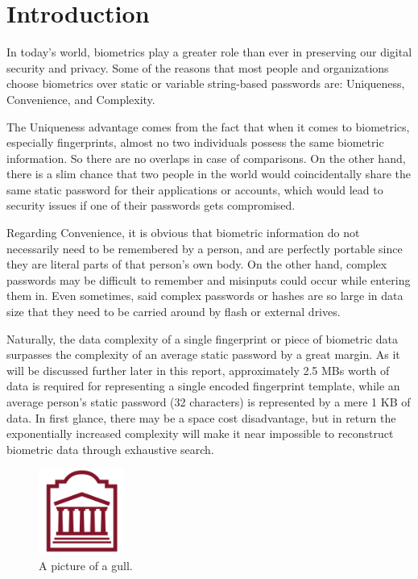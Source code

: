 \documentclass[fyp]{socreport}
\begin{document}
\chapter{Introduction}
In today's world, biometrics play a greater role than ever in preserving our digital security and privacy.  Some of the reasons that most people and organizations choose biometrics over static or variable string-based passwords are: Uniqueness, Convenience, and Complexity.

The Uniqueness advantage comes from the fact that when it comes to biometrics, especially fingerprints, almost no two individuals possess the same biometric information. So there are no overlaps in case of comparisons. On the other hand, there is a slim chance that two people in the world would coincidentally share the same static password for their applications or accounts, which would lead to security issues if one of their passwords gets compromised.

Regarding Convenience, it is obvious that biometric information do not necessarily need to be remembered by a person, and are perfectly portable since they are literal parts of that person's own body. On the other hand, complex passwords may be difficult to remember and misinputs could occur while entering them in. Even sometimes, said complex passwords or hashes are so large in data size that they need to be carried around by flash or external drives.

Naturally, the data complexity of a single fingerprint or piece of biometric data surpasses the complexity of an average static password by a great margin. As it will be discussed further later in this report, approximately 2.5 MBs worth of data is required for representing a single encoded fingerprint template, while an average person's static password (32 characters) is represented by a mere 1 KB of data. In first glance, there may be a space cost disadvantage, but in return the exponentially increased complexity will make it near impossible to reconstruct biometric data through exhaustive search.
\begin{figure}
	
	\centering
		\includegraphics[width=0.25\textwidth]{logo}
	\caption{A picture of a gull.}
\end{figure}
\end{document}
